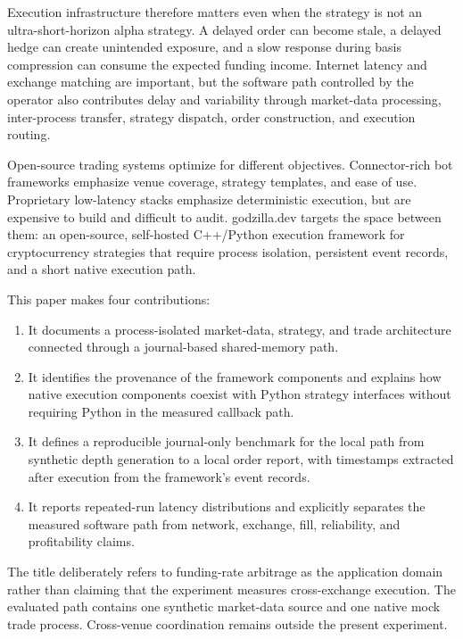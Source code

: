 \documentclass[11pt]{article}
\newcommand{\framework}{godzilla.dev}
\begin{document}
Execution infrastructure therefore matters even when the strategy is not an ultra-short-horizon alpha strategy. A delayed order can become stale, a delayed hedge can create unintended exposure, and a slow response during basis compression can consume the expected funding income. Internet latency and exchange matching are important, but the software path controlled by the operator also contributes delay and variability through market-data processing, inter-process transfer, strategy dispatch, order construction, and execution routing.

Open-source trading systems optimize for different objectives. Connector-rich bot frameworks emphasize venue coverage, strategy templates, and ease of use. Proprietary low-latency stacks emphasize deterministic execution, but are expensive to build and difficult to audit. \framework{} targets the space between them: an open-source, self-hosted C++/Python execution framework for cryptocurrency strategies that require process isolation, persistent event records, and a short native execution path.

This paper makes four contributions:
\begin{enumerate}[leftmargin=*,itemsep=2pt]
    \item It documents a process-isolated market-data, strategy, and trade architecture connected through a journal-based shared-memory path.
    \item It identifies the provenance of the framework components and explains how native execution components coexist with Python strategy interfaces without requiring Python in the measured callback path.
    \item It defines a reproducible journal-only benchmark for the local path from synthetic depth generation to a local order report, with timestamps extracted after execution from the framework's event records.
    \item It reports repeated-run latency distributions and explicitly separates the measured software path from network, exchange, fill, reliability, and profitability claims.
\end{enumerate}

The title deliberately refers to funding-rate arbitrage as the application domain rather than claiming that the experiment measures cross-exchange execution. The evaluated path contains one synthetic market-data source and one native mock trade process. Cross-venue coordination remains outside the present experiment.
\end{document}
